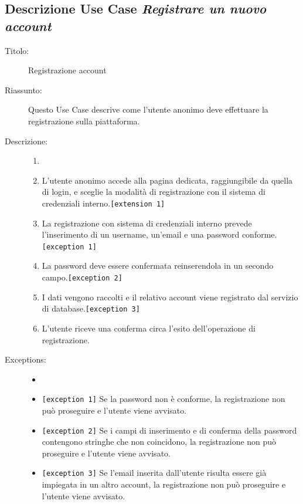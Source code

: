 \documentclass[11pt, a4paper]{article}
\theoremstyle{definition} %
\begin{document}
\subsection*{Descrizione Use Case \textit{Registrare un nuovo account}}
\begin{description}
    \item[Titolo:] Registrazione account
    
    \item[Riassunto:] Questo Use Case descrive come l'utente anonimo deve
    effettuare la registrazione sulla piattaforma.

    \item[Descrizione:]
    \begin{enumerate}
        \item[]
        \item L'utente anonimo accede alla pagina dedicata, raggiungibile da quella di login, e sceglie la modalità di registrazione con il sistema di credenziali interno.\texttt{[extension 1]}
        \item La registrazione con sistema di credenziali interno prevede l'inserimento di un username, un'email e una password conforme. \verb|[exception 1]|
        \item La password deve essere confermata reinserendola in un secondo campo.\verb|[exception 2]|
        \item I dati vengono raccolti e il relativo account viene registrato dal servizio di database.\texttt{[exception 3]}
        \item L'utente riceve una conferma circa l'esito dell'operazione di registrazione.
    \end{enumerate}
    
    \item[Exceptions:]
    \begin{itemize}
        \item[]
        \item \texttt{[exception 1]} Se la password non è conforme, la registrazione non può proseguire e l'utente viene avvisato.
        \item \texttt{[exception 2]} Se i campi di inserimento e di conferma della password contengono stringhe che non coincidono, la registrazione non può proseguire e l'utente viene avvisato.
        \item \texttt{[exception 3]} Se l'email inserita dall'utente risulta essere già impiegata in un altro account, la registrazione non può proseguire e l'utente viene avvisato.
    \end{itemize}


\end{description}
\end{document}
